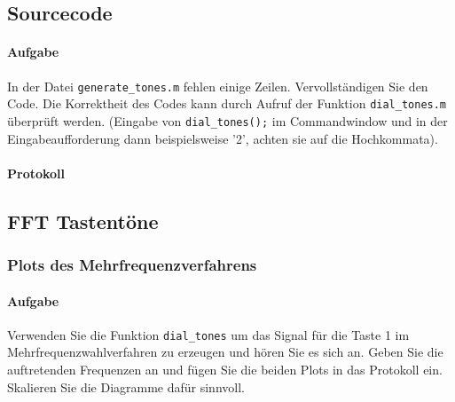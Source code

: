 \documentclass[10pt]{report}
\begin{document}
        \subsection{Sourcecode}
        \paragraph{Aufgabe}
        In der Datei \texttt{generate\_tones.m} fehlen einige Zeilen. Vervollständigen Sie den Code. Die
        Korrektheit des Codes kann durch Aufruf der Funktion \texttt{dial\_tones.m} überprüft werden.
        (Eingabe von \texttt{dial\_tones();} im Commandwindow und in der Eingabeaufforderung dann
        beispielsweise ’2’, achten sie auf die Hochkommata).
        \paragraph{Protokoll}
        

        \vspace{2cm}

        

        \subsection{FFT Tastentöne}
        \subsubsection{Plots des Mehrfrequenzverfahrens}
        \paragraph{Aufgabe}
        Verwenden Sie die Funktion \texttt{dial\_tones} um das Signal für die Taste
        \glqq{}1\grqq{} im Mehrfrequenzwahlverfahren
        zu erzeugen und hören Sie es sich an. Geben Sie die auftretenden
        Frequenzen an und fügen Sie die beiden Plots in das Protokoll ein. Skalieren
        Sie die Diagramme dafür sinnvoll.
\end{document}
